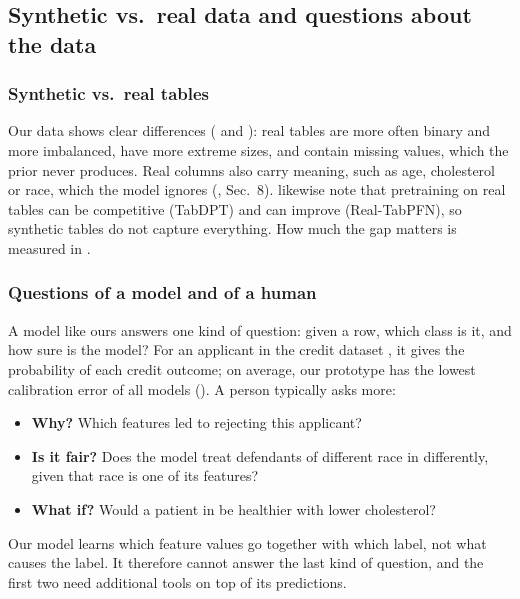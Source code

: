 \subsection{Synthetic vs.\ real data and questions about the data}\label{sec:questions}

\subsubsection{Synthetic vs.\ real tables}\label{sec:synthetic_vs_real}

Our data shows clear differences ( and ):
real tables are more often binary and more imbalanced, have more extreme
sizes, and contain missing values, which the prior never produces. Real
columns also carry meaning, such as age, cholesterol or race, which the
model ignores (\citealt{qu2026tabiclv2}, Sec.~8). \citet{qu2026tabiclv2}
likewise note that pretraining on real tables can be competitive (TabDPT)
and can improve \tabpfn{} (Real-TabPFN), so synthetic tables do not capture
everything. How much the gap matters is measured in .

\subsubsection{Questions of a model and of a human}\label{sec:open_questions}

A model like ours answers one kind of question: given a row, which class is
it, and how sure is the model? For an applicant in the credit dataset
, it gives the probability of each credit outcome; on
average, our prototype has the lowest calibration error of all models
(). A person typically asks more:
\begin{itemize}
  \item \textbf{Why?} Which features led to rejecting this applicant?
  \item \textbf{Is it fair?} Does the model treat defendants of different
    race in  differently, given that race is one
    of its features?
  \item \textbf{What if?} Would a patient in  be healthier
    with lower cholesterol?
\end{itemize}
Our model learns which feature values go together with which label, not
what causes the label. It therefore cannot answer the last kind of question,
and the first two need additional tools on top of its predictions.
